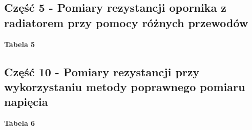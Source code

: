 \documentclass[11pt]{article}
\begin{document}
    \subsection*{Część 5 - Pomiary rezystancji opornika z radiatorem przy pomocy różnych przewodów}
    \begin{center}
        \small{\textbf{Tabela 5}}
    \end{center}
    \begin{adjustwidth}{-25pt}{}
    \begin{center}
    \end{center}
    \end{adjustwidth}
    \subsection*{Część 10 - Pomiary rezystancji przy wykorzystaniu metody poprawnego pomiaru napięcia}
    \begin{center}
        \small{\textbf{Tabela 6}}
    \end{center}
    \begin{adjustwidth}{-50pt}{}
    \begin{center}
    \end{center}
    \end{adjustwidth}
\end{document}
